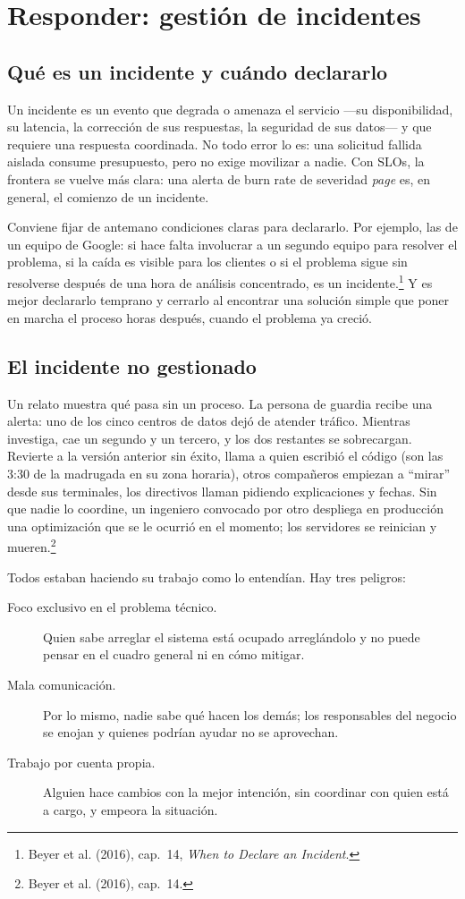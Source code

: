 \documentclass[variant=apuntes,cover=institutional,mode=screen]{ua-engineering-v6-article}
\begin{document}
\section{Responder: gestión de incidentes}\label{sec:incidentes}

\subsection{Qué es un incidente y cuándo declararlo}

Un incidente es un evento que degrada o amenaza el servicio ---su disponibilidad, su latencia, la corrección de sus respuestas, la seguridad de sus datos--- y que requiere una respuesta coordinada. No todo error lo es: una solicitud fallida aislada consume presupuesto, pero no exige movilizar a nadie. Con SLOs, la frontera se vuelve más clara: una alerta de burn rate de severidad \emph{page} es, en general, el comienzo de un incidente.

Conviene fijar de antemano condiciones claras para declararlo. Por ejemplo, las de un equipo de Google: si hace falta involucrar a un segundo equipo para resolver el problema, si la caída es visible para los clientes o si el problema sigue sin resolverse después de una hora de análisis concentrado, es un incidente.\footnote{Beyer et al. (2016), cap.~14, \emph{When to Declare an Incident}.} Y es mejor declararlo temprano y cerrarlo al encontrar una solución simple que poner en marcha el proceso horas después, cuando el problema ya creció.

\subsection{El incidente no gestionado}

Un relato muestra qué pasa sin un proceso. La persona de guardia recibe una alerta: uno de los cinco centros de datos dejó de atender tráfico. Mientras investiga, cae un segundo y un tercero, y los dos restantes se sobrecargan. Revierte a la versión anterior sin éxito, llama a quien escribió el código (son las 3:30 de la madrugada en su zona horaria), otros compañeros empiezan a ``mirar'' desde sus terminales, los directivos llaman pidiendo explicaciones y fechas. Sin que nadie lo coordine, un ingeniero convocado por otro despliega en producción una optimización que se le ocurrió en el momento; los servidores se reinician y mueren.\footnote{Beyer et al. (2016), cap.~14.}

Todos estaban haciendo su trabajo como lo entendían. Hay tres peligros:
\begin{description}
\item[Foco exclusivo en el problema técnico.] Quien sabe arreglar el sistema está ocupado arreglándolo y no puede pensar en el cuadro general ni en cómo mitigar.
\item[Mala comunicación.] Por lo mismo, nadie sabe qué hacen los demás; los responsables del negocio se enojan y quienes podrían ayudar no se aprovechan.
\item[Trabajo por cuenta propia.] Alguien hace cambios con la mejor intención, sin coordinar con quien está a cargo, y empeora la situación.
\end{description}
\end{document}
